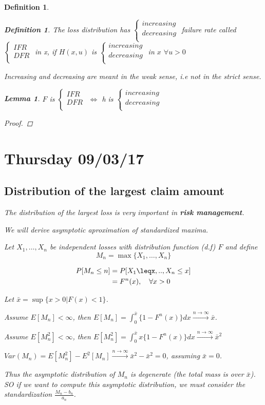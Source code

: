\documentclass[11pt,a4paper,oneside]{article}\usepackage[]{graphicx}\usepackage[]{color}
\newtheorem{defi}[subsection]{Definition}
\newtheorem{lema}[thm]{Lemma}
\newcommand{\ttwopartdef}[2]
{
	\left\{
		\begin{array}{ll}
			#1 \\
			#2 \\
		\end{array}
	\right.
}
\begin{document}
\begin{algin*}
\begin{defi}
\begin{defi} The loss distribution has $\ttwopartdef{increasing}{decreasing}$ failure rate called $\ttwopartdef{IFR}{DFR}$ in x, if $H(x,u)$ is $\ttwopartdef{increasing}{decreasing}$ in $x$ $\forall u>0$
\end{defi}
Increasing and decreasing are meant in the weak sense, i.e not in the strict sense.

\begin{lema} $F$ is $\ttwopartdef{IFR}{DFR}$ $\Leftrightarrow$ h is $\ttwopartdef{increasing}{decreasing}$
\end{lema}
\begin{proof}

\end{proof}
\section{Thursday 09/03/17}
\subsection{Distribution of the largest claim amount}

The distribution of the largest loss is very important in \textbf{risk management}.

We will derive asymptotic aproximation of standardized maxima.

Let $X_1,\ldots,X_n$ be independent losses with distribution function (d.f) $F$ and define 
\[M_n=\max\{X_1,\ldots,X_n\}\]

\begin{align*}
P[M_n\leq n] &= P[X_1\leqx,..,X_n\leq x]\\
&=F^n(x), \quad  \forall x>0\\
\end{align*}

Let $\bar{x}=\sup\{x>0|F(x)<1\}$.

Assume $E[M_n]<\infty$, then $E[M_n]=\displaystyle\int_{0}^{\bar{x}}\{1-F^n(x)\}dx\xrightarrow{n\rightarrow \infty}{\bar{x}}$.

Assume $E[M^2_n]<\infty$, then $E[M_n^2]=\displaystyle\int_{0}^{\bar{x}}x\{1-F^n(x)\}dx\xrightarrow{n\rightarrow \infty}{\bar{x}^2}$

$Var(M_n)=E[M^2_n]-E^2[M_n]\xrightarrow{n\rightarrow \infty}{\bar{x}^2-\bar{x}^2}=0$, assuming $\bar{x}=0$.\newline

Thus the asymptotic distribution of $M_n$ is degenerate (the total mass is over $\bar{x}$). SO if we want to compute this asymptotic distribution, we must consider the standardization $\frac{M_n-b_n}{a_n}$.


\end{defi}
\end{algin*}
\end{document}
